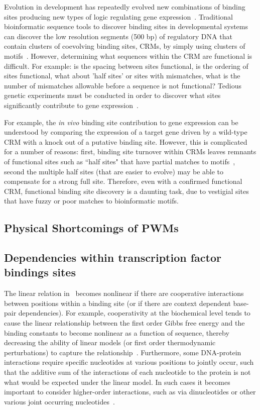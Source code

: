 Evolution in development has repeatedly evolved new combinations of binding sites producing new types of logic regulating gene expression~\cite{Gehring1998,Davidson2001,Davidson2006}.  Traditional bioinformatic sequence tools to discover binding sites in developmental systems 
can discover the low resolution segments (500 bp) of regulatory DNA that contain clusters of coevolving binding sites, CRMs, by simply using clusters of motifs~\cite{Brown2008}.  However, determining what sequences within the CRM are functional is difficult. For example: is the spacing between sites functional, is the ordering of sites functional, what about 'half sites' or sites with mismatches, what is the number of mismatches allowable before a sequence is not functional?  Tedious genetic experiments must be conducted in order to discover what sites significantly contribute to gene expression~\cite{Davidson2006}.  

For example, the \textit{in vivo} binding site contribution to gene expression can be understood by comparing the expression of a target gene driven by a wild-type CRM with a knock out of a putative binding site. However, this is complicated for a number of reasons: first, binding site turnover within CRMs leaves remnants of functional sites such as ``half sites" that have partial matches to motifs~\cite{pmid20981027}, second the multiple half sites (that are easier to evolve) may be able to compensate for a strong full site. Therefore, even with a confirmed functional CRM, functional binding site discovery is a daunting task, due to vestigial sites that have fuzzy or poor matches to bioinformatic motifs.
	
\subsection{Physical Shortcomings of PWMs}
	
  \subsection{Dependencies within transcription factor bindings sites }
The linear relation in~ becomes nonlinear if there are cooperative interactions between positions within a binding site (or if there are context dependent base-pair dependencies).  For example, cooperativity at the biochemical level tends to cause the linear relationship between the first order Gibbs free energy and the binding constants to become nonlinear as a function of sequence, thereby decreasing the ability of linear models (or first order thermodynamic perturbations) to capture the relationship~\cite{hill,bialek}.  Furthermore, some DNA-protein interactions require specific nucleotides at various positions to jointly occur, such that the additive sum of the interactions of each nucleotide to the protein is not what would be expected under the linear model.  In such cases it becomes important to consider higher-order interactions, such as via dinucleotides or other various joint occurring nucleotides~\cite{pmid20339533,pmid18725950}.


